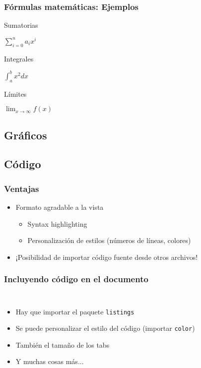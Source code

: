 \documentclass[svgnames]{beamer}
\begin{document}
\begin{frame}
  \frametitle{Fórmulas matemáticas: Ejemplos}
  Sumatorias
  {}
  \begin{center}
    $\sum_{i=0}^{n} a_ix^i$   
  \end{center}\pause
  Integrales
  {}
  \begin{center}
    $\int_{a}^{b} x^2 dx$   
  \end{center}\pause
  Límites
  {}
  \begin{center}
    $\lim_{x\to\infty} f(x)$  
  \end{center}\pause

\end{frame}

\subsection{Gráficos}

\begin{frame}
  \frametitle{}
\end{frame}


\subsection{Código}

\begin{frame}
  \frametitle{Ventajas}
  \begin{itemize}
   \item Formato agradable a la vista
   \begin{itemize}
    \item Syntax highlighting
    \item Personalización de estilos (números de líneas, colores)
   \end{itemize}
   \item ¡Posibilidad de importar código fuente desde otros archivos!
  \end{itemize}
\end{frame}

\begin{frame}
  \frametitle{Incluyendo código en el documento}
  \begin{columns}
    \centering
      
    \centering
      \begin{itemize}
        \item Hay que importar el paquete \texttt{listings}
        \item Se puede personalizar el estilo del código (importar \texttt{color})
        \item También el tamaño de los tabs
        \item Y muchas cosas más...
      \end{itemize}
  \end{columns}
\end{frame}
\end{document}
